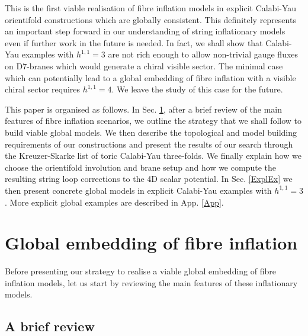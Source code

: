 \documentclass[11pt,a4paper]{article}
\begin{document}
This is the first viable realisation of fibre inflation models in explicit Calabi-Yau orientifold constructions which are globally consistent. This definitely represents an important step forward in our understanding of string inflationary models even if further work in the future is needed. In fact, we shall show that Calabi-Yau examples with $h^{1,1}=3$ are not rich enough to allow non-trivial gauge fluxes on D7-branes which would generate a chiral visible sector. The minimal case which can potentially lead to a global embedding of fibre inflation with a visible chiral sector requires $h^{1,1}=4$. We leave the study of this case for the future. 

This paper is organised as follows. In Sec. \ref{sec2}, after a brief review of the main features of fibre inflation scenarios, we outline the strategy that we shall follow to build viable global models. We then describe the topological and model building requirements of our constructions and present the results of our search through the Kreuzer-Skarke list of toric Calabi-Yau three-folds. We finally explain how we choose the orientifold involution and brane setup and how we compute the resulting string loop corrections to the 4D scalar potential. In Sec. \ref{ExplEx} we then present concrete global models in explicit Calabi-Yau examples with $h^{1,1}=3$. More explicit global examples are described in App. \ref{App}.


\section{Global embedding of fibre inflation}
\label{sec2}

Before presenting our strategy to realise a viable global embedding of fibre inflation models, let us start by reviewing the main features of these inflationary models.

\subsection{A brief review}
\label{Review}
\end{document}
